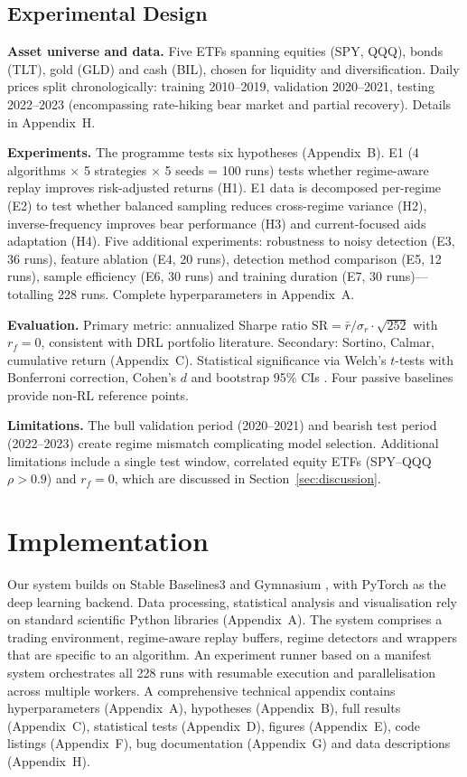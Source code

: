 \documentclass[11pt,a4paper]{article}
\begin{document}
\subsection{Experimental Design}

\textbf{Asset universe and data.} Five ETFs spanning equities (SPY, QQQ), bonds (TLT), gold (GLD) and cash (BIL), chosen for liquidity and diversification. Daily prices split chronologically: training 2010--2019, validation 2020--2021, testing 2022--2023 (encompassing rate-hiking bear market and partial recovery). Details in Appendix~H.

\textbf{Experiments.} The programme tests six hypotheses (Appendix~B). E1 (4 algorithms $\times$ 5 strategies $\times$ 5 seeds = 100 runs) tests whether regime-aware replay improves risk-adjusted returns (H1). E1 data is decomposed per-regime (E2) to test whether balanced sampling reduces cross-regime variance (H2), inverse-frequency improves bear performance (H3) and current-focused aids adaptation (H4). Five additional experiments: robustness to noisy detection (E3, 36 runs), feature ablation (E4, 20 runs), detection method comparison (E5, 12 runs), sample efficiency (E6, 30 runs) and training duration (E7, 30 runs)---totalling 228 runs. Complete hyperparameters in Appendix~A.

\textbf{Evaluation.} Primary metric: annualized Sharpe ratio $\text{SR} = \bar{r}/\sigma_r \cdot \sqrt{252}$ with $r_f = 0$, consistent with DRL portfolio literature. Secondary: Sortino, Calmar, cumulative return (Appendix~C). Statistical significance via Welch's $t$-tests with Bonferroni correction, Cohen's $d$ \citep{cohen1988statistical} and bootstrap 95\% CIs \citep{efron1979bootstrap}. Four passive baselines provide non-RL reference points.

\textbf{Limitations.} The bull validation period (2020--2021) and bearish test period (2022--2023) create regime mismatch complicating model selection. Additional limitations include a single test window, correlated equity ETFs (SPY--QQQ $\rho > 0.9$) and $r_f = 0$, which are discussed in Section~\ref{sec:discussion}.


\section{Implementation}
\label{sec:implementation}

Our system builds on Stable Baselines3 \citep{sb3} and Gymnasium \citep{gymnasium}, with PyTorch as the deep learning backend. Data processing, statistical analysis and visualisation rely on standard scientific Python libraries (Appendix~A). The system comprises a trading environment, regime-aware replay buffers, regime detectors and wrappers that are specific to an algorithm. An experiment runner based on a manifest system orchestrates all 228 runs with resumable execution and parallelisation across multiple workers. A comprehensive technical appendix contains hyperparameters (Appendix~A), hypotheses (Appendix~B), full results (Appendix~C), statistical tests (Appendix~D), figures (Appendix~E), code listings (Appendix~F), bug documentation (Appendix~G) and data descriptions (Appendix~H).
\end{document}

